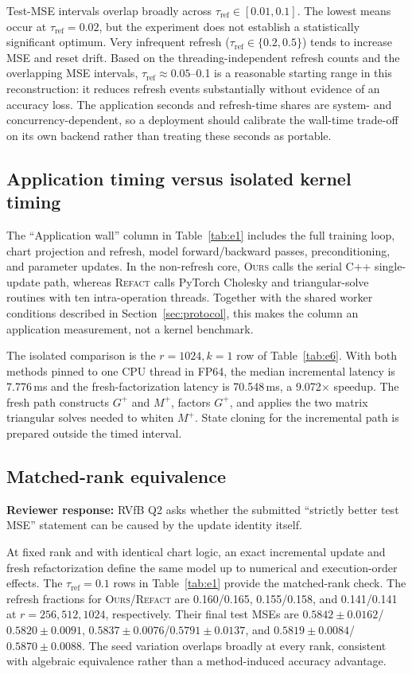 \documentclass[11pt]{article}
\newcommand{\ours}{\textsc{Ours}}
\newcommand{\refact}{\textsc{Refact}}
\newcommand{\tref}{\tau_{\mathrm{ref}}}
\newcommand{\reviewer}[1]{\textbf{Reviewer response:} #1}
\begin{document}
Test-MSE intervals overlap broadly across \(\tref\in[0.01,0.1]\).  The lowest
means occur at \(\tref=0.02\), but the experiment does not establish a
statistically significant optimum.  Very infrequent refresh
(\(\tref\in\{0.2,0.5\}\)) tends to increase MSE and reset drift.  Based on the
threading-independent refresh counts and the overlapping MSE intervals,
\(\tref\approx0.05\)--0.1 is a reasonable starting range in this
reconstruction: it reduces refresh events substantially without evidence of
an accuracy loss.  The application seconds and refresh-time shares are
system- and concurrency-dependent, so a deployment should calibrate the
wall-time trade-off on its own backend rather than treating these seconds as
portable.

\subsection{Application timing versus isolated kernel timing}

The ``Application wall'' column in Table~\ref{tab:e1} includes the full
training loop, chart projection and refresh, model forward/backward passes,
preconditioning, and parameter updates.  In the non-refresh core, \ours{}
calls the serial C++ single-update path, whereas \refact{} calls PyTorch
Cholesky and triangular-solve routines with ten intra-operation threads.
Together with the shared worker conditions described in
Section~\ref{sec:protocol}, this makes the column an application measurement,
not a kernel benchmark.

The isolated comparison is the \(r=1024,k=1\) row of
Table~\ref{tab:e6}.  With both methods pinned to one CPU thread in FP64, the
median incremental latency is 7.776\,ms and the fresh-factorization latency is
70.548\,ms, a 9.072\(\times\) speedup.  The fresh path constructs \(G^+\) and
\(M^+\), factors \(G^+\), and applies the two matrix triangular solves needed
to whiten \(M^+\).  State cloning for the incremental path is prepared outside
the timed interval.

\subsection{Matched-rank equivalence}

\reviewer{RVfB Q2 asks whether the submitted ``strictly better test MSE''
statement can be caused by the update identity itself.}

At fixed rank and with identical chart logic, an exact incremental update and
fresh refactorization define the same model up to numerical and
execution-order effects.  The \(\tref=0.1\) rows in
Table~\ref{tab:e1} provide the matched-rank check.  The refresh fractions for
\ours{}/\refact{} are 0.160/0.165, 0.155/0.158, and 0.141/0.141 at
\(r=256,512,1024\), respectively.  Their final test MSEs are
\(0.5842\pm0.0162\)/\(0.5820\pm0.0091\),
\(0.5837\pm0.0076\)/\(0.5791\pm0.0137\), and
\(0.5819\pm0.0084\)/\(0.5870\pm0.0088\).  The seed variation overlaps
broadly at every rank, consistent with algebraic equivalence rather than a
method-induced accuracy advantage.
\end{document}
